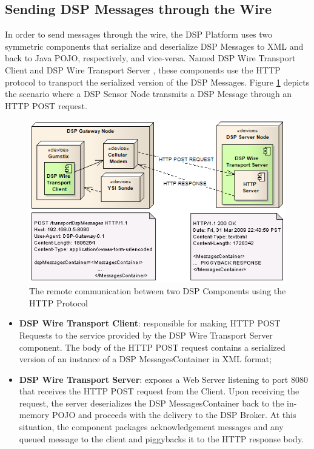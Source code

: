 \subsection{Sending DSP Messages through the Wire}
\label{sec:dsp-serialization}

In order to send messages through the wire, the DSP Platform uses two symmetric
components that serialize and deserialize DSP Messages to XML and back to Java
POJO, respectively, and vice-versa. Named DSP Wire Transport Client and DSP
Wire Transport Server \cite{netbeams2009}, these components use the HTTP
\cite{http} protocol to transport the serialized version of the DSP Messages.
Figure \ref{fig:DSP-to-DSP-Remote-Communication} depicts the scenario where a
DSP Sensor Node transmits a DSP Message through an HTTP POST request.

\begin{figure}[!b]
  \centering
  \includegraphics[scale=0.6]{../diagrams/DSP-to-DSP-Remote-Communication}
  \caption{The remote communication between two DSP Components using the HTTP
  Protocol}
  \label{fig:DSP-to-DSP-Remote-Communication}
\end{figure}

\begin{itemize}
  \item \textbf{DSP Wire Transport Client}: responsible for making HTTP POST
  Requests to the service provided by the DSP Wire Transport Server component.
  The body of the HTTP POST request contains a serialized version of an
  instance of a DSP MessagesContainer in XML format;
  \item \textbf{DSP Wire Transport Server}: exposes a Web Server listening to
  port 8080 that receives the HTTP POST request from the Client. Upon receiving
  the request, the server deserializes the DSP MessagesContainer back to the
  in-memory POJO and proceeds with the delivery to the DSP Broker. At this
  situation, the component packages acknowledgement messages and any queued
  message to the client and piggybacks \cite{xml-piggybacking} it to the HTTP
  response body.
\end{itemize}

